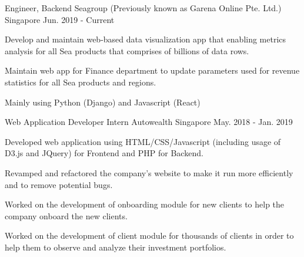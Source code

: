 

\begin{cventries}

  \cventry
    {Engineer, Backend} %
    {Seagroup (Previously known as Garena Online Pte. Ltd.)} %
    {Singapore} %
    {Jun. 2019 - Current} %
    {
      \begin{cvitems} %
        \item {Develop and maintain web-based data visualization app that enabling metrics analysis for all Sea products that comprises of billions of data rows.}
        \item {Maintain web app for Finance department to update parameters used for revenue statistics for all Sea products and regions.}
        \item {Mainly using Python (Django) and Javascript (React)}
      \end{cvitems}
    }

  \cventry
    {Web Application Developer Intern} %
    {Autowealth} %
    {Singapore} %
    {May. 2018 - Jan. 2019} %
    {
      \begin{cvitems} %
        \item {Developed web application using HTML/CSS/Javascript (including usage of D3.js and JQuery) for Frontend and PHP for Backend.}
        \item {Revamped and refactored the company’s website to make it run more efficiently and to remove potential bugs.}
        \item {Worked on the development of onboarding module for new clients to help the company onboard the new clients.}
        \item {Worked on the development of client module for thousands of clients in order to help them to observe and analyze their investment portfolios.}
      \end{cvitems}
    }

\end{cventries}
